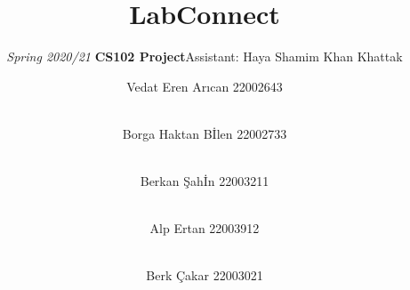 \documentclass[acmsmall,nonacm]{acmart}
\begin{document}
\title{LabConnect}
\subtitle{\textit{Spring 2020/21} \textbf{CS102 Project}\hspace{10cm}Assistant: Haya Shamim Khan Khattak}

\author{Vedat Eren Arıcan 22002643}

\author{\\Borga Haktan B{\.{I}}len 22002733}

\author{\\Berkan Şah{\.{I}}n 22003211}

\author{\\Alp Ertan 22003912}

\author{\\Berk Çakar 22003021}

\renewcommand{\shortauthors}{LabConnect}

\end{document}
